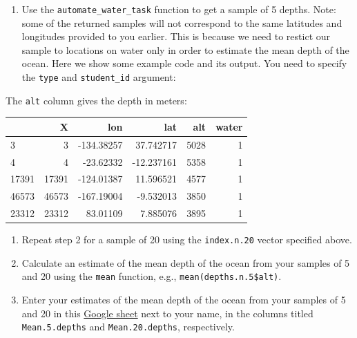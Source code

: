 \documentclass[letterpaper,9pt,twoside,printwatermark=false]{pinp}
\providecommand{\tightlist}{%
  \setlength{\itemsep}{0pt}\setlength{\parskip}{0pt}}
\begin{document}
\begin{enumerate}
\def\labelenumi{\arabic{enumi}.}
\setcounter{enumi}{1}
\tightlist
\item
  Use the \texttt{automate\_water\_task} function to get a sample of 5
  depths. Note: some of the returned samples will not correspond to the
  same latitudes and longitudes provided to you earlier. This is because
  we need to restict our sample to locations on water only in order to
  estimate the mean depth of the ocean. Here we show some example code
  and its output. You need to specify the \texttt{type} and
  \texttt{student\_id} argument:
\end{enumerate}

\begin{Shaded}
\begin{Highlighting}[]
\NormalTok{ <-}\StringTok{ }\NormalTok{(}\NormalTok{, } \NormalTok{, } \NormalTok{)}
\end{Highlighting}
\end{Shaded}

\newpage

The \texttt{alt} column gives the depth in meters:

\begin{longtable}[]{@{}lrrrrr@{}}
\toprule
& X & lon & lat & alt & water\tabularnewline
\midrule
\endhead
3 & 3 & -134.38257 & 37.742717 & 5028 & 1\tabularnewline
4 & 4 & -23.62332 & -12.237161 & 5358 & 1\tabularnewline
17391 & 17391 & -124.01387 & 11.596521 & 4577 & 1\tabularnewline
46573 & 46573 & -167.19004 & -9.532013 & 3850 & 1\tabularnewline
23312 & 23312 & 83.01109 & 7.885076 & 3895 & 1\tabularnewline
\bottomrule
\end{longtable}

\begin{enumerate}
\def\labelenumi{\arabic{enumi}.}
\setcounter{enumi}{2}
\item
  Repeat step 2 for a sample of 20 using the \texttt{index.n.20} vector
  specified above.
\item
  Calculate an estimate of the mean depth of the ocean from your samples
  of 5 and 20 using the \texttt{mean} function, e.g.,
  \texttt{mean(depths.n.5\$alt)}.
\item
  Enter your estimates of the mean depth of the ocean from your samples
  of 5 and 20 in this
  \href{https://docs.google.com/spreadsheets/d/1Mnxeq9nQcTdQycZ7S_62fYFiNC5_a3fibsyodzfwO58/edit?usp=sharing}{Google
  sheet} next to your name, in the columns titled \texttt{Mean.5.depths}
  and \texttt{Mean.20.depths}, respectively.
\end{enumerate}
\end{document}

